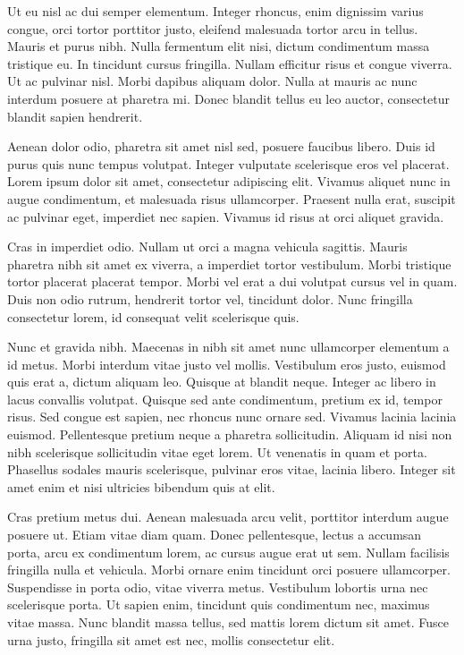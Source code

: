 \documentclass[final,5p,times,twocolumn]{elsarticle}
\begin{document}
Ut eu nisl ac dui semper elementum. Integer rhoncus, enim dignissim varius congue, orci tortor porttitor justo, eleifend malesuada tortor arcu in tellus. Mauris et purus nibh. Nulla fermentum elit nisi, dictum condimentum massa tristique eu. In tincidunt cursus fringilla. Nullam efficitur risus et congue viverra. Ut ac pulvinar nisl. Morbi dapibus aliquam dolor. Nulla at mauris ac nunc interdum posuere at pharetra mi. Donec blandit tellus eu leo auctor, consectetur blandit sapien hendrerit.

Aenean dolor odio, pharetra sit amet nisl sed, posuere faucibus libero. Duis id purus quis nunc tempus volutpat. Integer vulputate scelerisque eros vel placerat. Lorem ipsum dolor sit amet, consectetur adipiscing elit. Vivamus aliquet nunc in augue condimentum, et malesuada risus ullamcorper. Praesent nulla erat, suscipit ac pulvinar eget, imperdiet nec sapien. Vivamus id risus at orci aliquet gravida.

Cras in imperdiet odio. Nullam ut orci a magna vehicula sagittis. Mauris pharetra nibh sit amet ex viverra, a imperdiet tortor vestibulum. Morbi tristique tortor placerat placerat tempor. Morbi vel erat a dui volutpat cursus vel in quam. Duis non odio rutrum, hendrerit tortor vel, tincidunt dolor. Nunc fringilla consectetur lorem, id consequat velit scelerisque quis.

Nunc et gravida nibh. Maecenas in nibh sit amet nunc ullamcorper elementum a id metus. Morbi interdum vitae justo vel mollis. Vestibulum eros justo, euismod quis erat a, dictum aliquam leo. Quisque at blandit neque. Integer ac libero in lacus convallis volutpat. Quisque sed ante condimentum, pretium ex id, tempor risus. Sed congue est sapien, nec rhoncus nunc ornare sed. Vivamus lacinia lacinia euismod. Pellentesque pretium neque a pharetra sollicitudin. Aliquam id nisi non nibh scelerisque sollicitudin vitae eget lorem. Ut venenatis in quam et porta. Phasellus sodales mauris scelerisque, pulvinar eros vitae, lacinia libero. Integer sit amet enim et nisi ultricies bibendum quis at elit.

Cras pretium metus dui. Aenean malesuada arcu velit, porttitor interdum augue posuere ut. Etiam vitae diam quam. Donec pellentesque, lectus a accumsan porta, arcu ex condimentum lorem, ac cursus augue erat ut sem. Nullam facilisis fringilla nulla et vehicula. Morbi ornare enim tincidunt orci posuere ullamcorper. Suspendisse in porta odio, vitae viverra metus. Vestibulum lobortis urna nec scelerisque porta. Ut sapien enim, tincidunt quis condimentum nec, maximus vitae massa. Nunc blandit massa tellus, sed mattis lorem dictum sit amet. Fusce urna justo, fringilla sit amet est nec, mollis consectetur elit.
\end{document}
